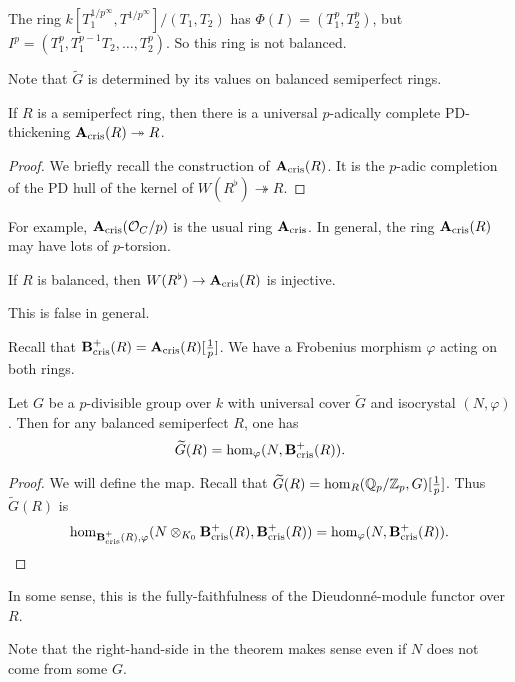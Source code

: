 \begin{example}
The ring $k[T_1^{1/p^\infty},T^{1/p^\infty}] / (T_1,T_2)$ has 
$\Phi(I)=(T_1^p,T_2^p)$, but $I^p=(T_1^p,T_1^{p-1} T_2,\dots,T_2^p)$. So this 
ring is not balanced. 
\end{example}

Note that $\widetilde G$ is determined by its values on balanced semiperfect 
rings. 

\begin{proposition}[Fontaine]
If $R$ is a semiperfect ring, then there is a universal $p$-adically complete 
PD-thickening $\mathbf{A}_\textnormal{cris}(R)\twoheadrightarrow R$. 
\end{proposition}
\begin{proof}
We briefly recall the construction of $\mathbf{A}_\textnormal{cris}(R)$. It is the $p$-adic completion of 
the PD hull of the kernel of $W(R^\flat)\twoheadrightarrow R$. 
\end{proof}

For example, $\mathbf{A}_\textnormal{cris}(\mathcal{O}_C/p)$ is the usual ring $\mathbf{A}_\textnormal{cris}$. In general, the ring 
$\mathbf{A}_\textnormal{cris}(R)$ may have lots of $p$-torsion. 

\begin{proposition}
If $R$ is balanced, then $W(R^\flat) \to \mathbf{A}_\textnormal{cris}(R)$ is injective. 
\end{proposition}

This is false in general. 

Recall that $\mathbf{B}_\textnormal{cris}^+(R)=\mathbf{A}_\textnormal{cris}(R)[\frac 1 p]$. We have a Frobenius morphism 
$\varphi$ acting on both rings. 

\begin{theorem}
Let $G$ be a $p$-divisible group over $k$ with universal cover $\widetilde G$ and 
isocrystal $(N,\varphi)$. Then for any balanced semiperfect $R$, one has 
\[
  \widetilde G(R) = \hom_\varphi(N,\mathbf{B}_\textnormal{cris}^+(R)) .
\]
\end{theorem}
\begin{proof}
We will define the map. Recall that 
$\widetilde G(R)=\hom_R(\mathbb{Q}_p/\mathbb{Z}_p,G)[\frac 1 p]$. Thus $\widetilde G(R)$ is 
\[
  \hom_{\mathbf{B}_\textnormal{cris}^+(R),\varphi}(N\otimes_{K_0} \mathbf{B}_\textnormal{cris}^+(R),\mathbf{B}_\textnormal{cris}^+(R)) = \hom_\varphi(N,\mathbf{B}_\textnormal{cris}^+(R)) .
\]
\end{proof}

In some sense, this is the fully-faithfulness of the Dieudonn\'e-module functor 
over $R$. 

Note that the right-hand-side in the theorem makes sense even if $N$ does not come 
from some $G$. 

